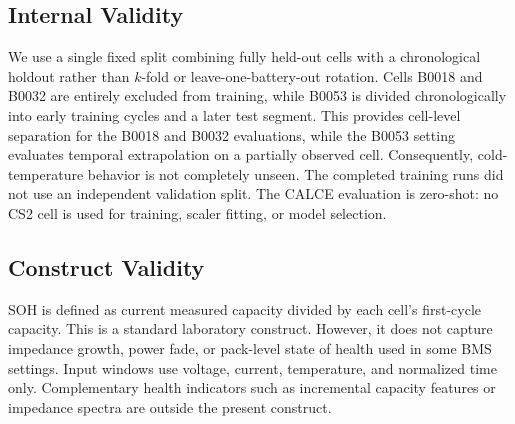 \documentclass[a4paper,fleqn]{cas-sc}
\begin{document}
\subsection{Internal Validity}\label{sec:internal}
We use a single fixed split combining fully held-out cells with a chronological holdout rather than $k$-fold or leave-one-battery-out rotation. Cells B0018 and B0032 are entirely excluded from training, while B0053 is divided chronologically into early training cycles and a later test segment. This provides cell-level separation for the B0018 and B0032 evaluations, while the B0053 setting evaluates temporal extrapolation on a partially observed cell. Consequently, cold-temperature behavior is not completely unseen. The completed training runs did not use an independent validation split. The CALCE evaluation is zero-shot: no CS2 cell is used for training, scaler fitting, or model selection.

\subsection{Construct Validity}\label{sec:construct}
SOH is defined as current measured capacity divided by each cell's first-cycle capacity. This is a standard laboratory construct. However, it does not capture impedance growth, power fade, or pack-level state of health used in some BMS settings. 
Input windows use voltage, current, temperature, and normalized time only. Complementary health indicators such as incremental capacity features or impedance spectra are outside the present construct. 

\end{document}
